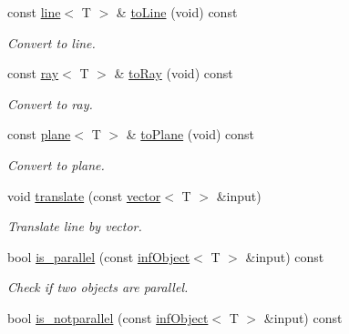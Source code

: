 \begin{DoxyCompactItemize}
\mbox{\label{classddd_1_1inf_object_ac3fc825ce0ede06d5a8a20b66209d92b}} 
const \hyperlink{classddd_1_1line}{line}$<$ T $>$ \& \hyperlink{classddd_1_1inf_object_ac3fc825ce0ede06d5a8a20b66209d92b}{to\+Line} (void) const
\begin{DoxyCompactList}\small\item\em Convert to line. \end{DoxyCompactList}\item 
\mbox{\label{classddd_1_1inf_object_a335cccf4b9b76fd52434634ce5f1164d}} 
const \hyperlink{classddd_1_1ray}{ray}$<$ T $>$ \& \hyperlink{classddd_1_1inf_object_a335cccf4b9b76fd52434634ce5f1164d}{to\+Ray} (void) const
\begin{DoxyCompactList}\small\item\em Convert to ray. \end{DoxyCompactList}\item 
\mbox{\label{classddd_1_1inf_object_a34e8653248e522f2cbfc8f0ec51471ed}} 
const \hyperlink{classddd_1_1plane}{plane}$<$ T $>$ \& \hyperlink{classddd_1_1inf_object_a34e8653248e522f2cbfc8f0ec51471ed}{to\+Plane} (void) const
\begin{DoxyCompactList}\small\item\em Convert to plane. \end{DoxyCompactList}\item 
void \hyperlink{classddd_1_1inf_object_a3cb132ed31c87d7a746993e58881c745}{translate} (const \hyperlink{classddd_1_1vector}{vector}$<$ T $>$ \&input)
\begin{DoxyCompactList}\small\item\em Translate line by vector. \end{DoxyCompactList}\item 
bool \hyperlink{classddd_1_1inf_object_abff7690f241c7d92f32e12692f7503af}{is\+\_\+parallel} (const \hyperlink{classddd_1_1inf_object}{inf\+Object}$<$ T $>$ \&input) const
\begin{DoxyCompactList}\small\item\em Check if two objects are parallel. \end{DoxyCompactList}\item 
bool \hyperlink{classddd_1_1inf_object_af3ca07b7ad46945dddb3a94121c74c1d}{is\+\_\+notparallel} (const \hyperlink{classddd_1_1inf_object}{inf\+Object}$<$ T $>$ \&input) const

\end{DoxyCompactItemize}
